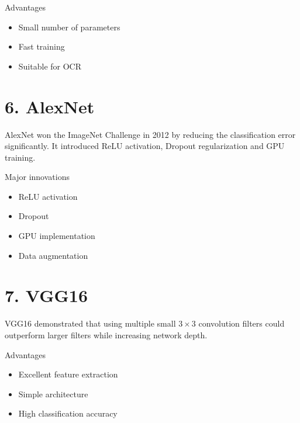 \documentclass[11pt]{article}
\begin{document}
Advantages

\begin{itemize}

\item Small number of parameters

\item Fast training

\item Suitable for OCR

\end{itemize}


\section*{6. AlexNet}

AlexNet won the ImageNet Challenge in 2012 by reducing the
classification error significantly. It introduced ReLU activation,
Dropout regularization and GPU training.


Major innovations

\begin{itemize}

\item ReLU activation

\item Dropout

\item GPU implementation

\item Data augmentation

\end{itemize}


\section*{7. VGG16}

VGG16 demonstrated that using multiple small $3\times3$ convolution
filters could outperform larger filters while increasing network depth.


Advantages

\begin{itemize}

\item Excellent feature extraction

\item Simple architecture

\item High classification accuracy

\end{itemize}
\end{document}
